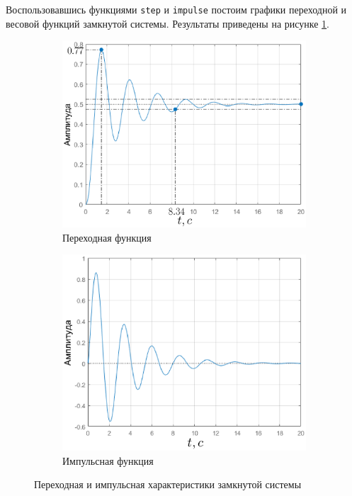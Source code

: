 \documentclass[fleqn, a4paper, 11pt, russian]{article}
\begin{document}
	Воспользовавшись функциями \texttt{step} и \texttt{impulse} постоим графики переходной и весовой функций замкнутой системы. Результаты приведены на рисунке \ref{closedtpw}.
	\begin{figure}[ht!]
		\centering
		\begin{subfigure}[b]{0.49\textwidth}
			\includegraphics[width = \textwidth]{Closed/tp}
			\caption{Переходная функция}
		\end{subfigure}
		\hfill
		\begin{subfigure}[b]{0.49\textwidth}
			\includegraphics[width = \textwidth]{Closed/imp}
			\caption{Импульсная функция}
		\end{subfigure}
		\caption{Переходная и импульсная характеристики замкнутой системы}
		\label{closedtpw}
	\end{figure}
	
\end{document}
